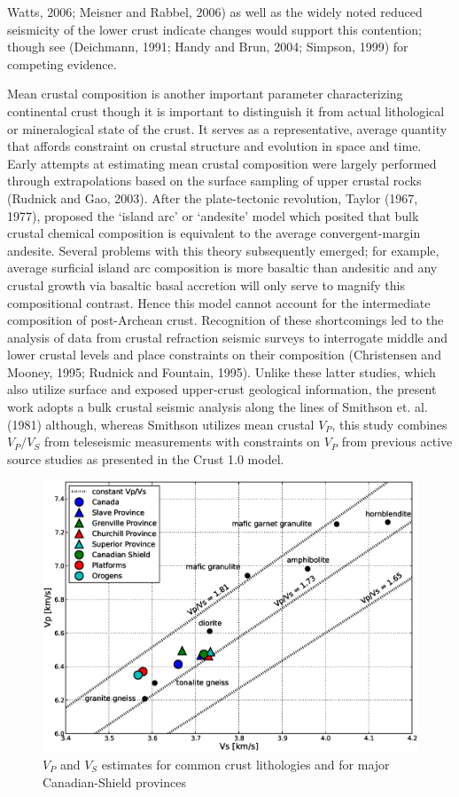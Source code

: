 \documentclass[review]{elsarticle}
\begin{document}
Watts, 2006; Meisner and Rabbel, 2006) as well as the widely noted reduced seismicity of the lower crust indicate changes would support this contention; though see (Deichmann, 1991; Handy and Brun, 2004; Simpson, 1999) for competing evidence.

Mean crustal composition is another important parameter characterizing continental crust though it is important to distinguish it from actual lithological or mineralogical state of the crust. It serves as a representative, average quantity that affords constraint on crustal structure and evolution in space and time. Early attempts at estimating mean crustal composition were largely performed through extrapolations based on the surface sampling of upper crustal rocks (Rudnick and Gao, 2003). After the plate-tectonic revolution, Taylor (1967, 1977), proposed the `island arc' or `andesite' model which posited that bulk crustal chemical composition is equivalent to the average convergent-margin andesite. Several problems with this theory subsequently emerged; for example, average surficial island arc composition is more basaltic than andesitic and any crustal growth via basaltic basal accretion will only serve to magnify this compositional contrast. Hence this model cannot account for the intermediate composition of post-Archean crust. Recognition of these shortcomings led to the analysis of data from crustal refraction seismic surveys to interrogate middle and lower crustal levels and place constraints on their composition (Christensen and Mooney, 1995; Rudnick and Fountain, 1995). Unlike these latter studies, which also utilize surface and exposed upper-crust geological information, the present work adopts a bulk crustal seismic analysis along the lines of Smithson et. al. (1981) although, whereas Smithson utilizes mean crustal $V_P$, this study combines $V_P/V_S$ from teleseismic measurements with constraints on $V_P$ from previous active source studies as presented in the Crust 1.0 model.

\begin{figure}
  \centering
  \includegraphics[width=\textwidth]{lithology.eps}
  \caption{$V_P$ and $V_S$ estimates for common crust lithologies and for major Canadian-Shield provinces}
  \label{fig:lith}
\end{figure}
\end{document}
